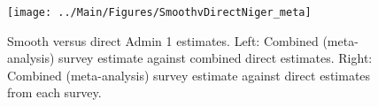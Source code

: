 \documentclass[12pt]{article}\usepackage[]{graphicx}\usepackage[]{color}
\newenvironment{knitrout}{}{} %
\begin{document}



\begin{knitrout}
\color{fgcolor}\begin{figure}[bht]

{\centering \texttt{[image: ../Main/Figures/SmoothvDirectNiger\_meta]} 

}

\caption[Smooth versus direct Admin 1 estimates]{Smooth versus direct Admin 1 estimates. Left: Combined (meta-analysis) survey estimate against combined direct estimates. Right: Combined (meta-analysis) survey estimate against direct estimates from each survey.}\label{fig:unnamed-chunk-253}
\end{figure}


\end{knitrout}
\end{document}
